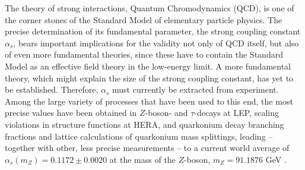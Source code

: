 \documentclass[aps,prl,twocolumn,groupedaddress]{revtex4}
\begin{document}

The theory of strong interactions, Quantum Chromodynamics (QCD), is one of the
corner stones of the Standard Model of elementary particle physics. The
precise determination of its fundamental parameter, the strong coupling
constant $\alpha_s$, bears important implications for the validity not only
of QCD itself, but also of even more fundamental theories, since these have to
contain the Standard Model as an effective field theory in the low-energy
limit. A more fundamental theory, which might explain the size of the strong
coupling constant, has yet to be established. Therefore, $\alpha_s$ must
currently be extracted from experiment. Among the large variety of processes
that have been used to this end, the most precise values have been obtained in
$Z$-boson- and $\tau$-decays at LEP, scaling violations in structure
functions at HERA, and quarkonium decay branching fractions and lattice
calculations of quarkonium mass splittings, leading -- together with other,
less precise measurements -- to a current world average of $\alpha_s(m_Z)=
0.1172\pm 0.0020$ at the mass of the $Z$-boson, $m_Z=91.1876$ GeV
\cite{Groom:2000in}.
\end{document}
